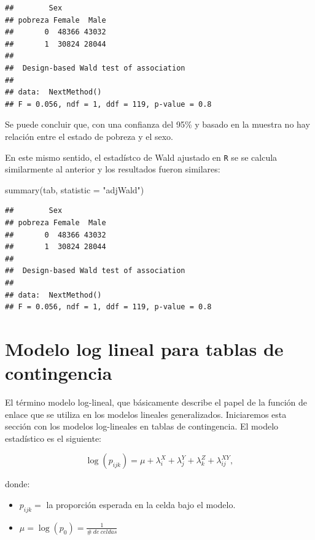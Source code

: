 \documentclass[
  12pt,
]{book}
\newenvironment{Shaded}{\begin{snugshade}}{\end{snugshade}}
\newcommand{\AttributeTok}[1]{\textcolor[rgb]{0.77,0.63,0.00}{#1}}
\newcommand{\FunctionTok}[1]{\textcolor[rgb]{0.00,0.00,0.00}{#1}}
\newcommand{\NormalTok}[1]{#1}
\newcommand{\StringTok}[1]{\textcolor[rgb]{0.31,0.60,0.02}{#1}}
\begin{document}
\begin{verbatim}
##        Sex
## pobreza Female  Male
##       0  48366 43032
##       1  30824 28044
## 
##  Design-based Wald test of association
## 
## data:  NextMethod()
## F = 0.056, ndf = 1, ddf = 119, p-value = 0.8
\end{verbatim}

Se puede concluir que, con una confianza del 95\% y basado en la muestra no hay relación entre el estado de pobreza y el sexo.

En este mismo sentido, el estadístco de Wald ajustado en \texttt{R} se se calcula similarmente al anterior y los resultados fueron similares:

\begin{Shaded}
\begin{Highlighting}[]
\FunctionTok{summary}\NormalTok{(tab, }\AttributeTok{statistic =} \StringTok{"adjWald"}\NormalTok{)}
\end{Highlighting}
\end{Shaded}

\begin{verbatim}
##        Sex
## pobreza Female  Male
##       0  48366 43032
##       1  30824 28044
## 
##  Design-based Wald test of association
## 
## data:  NextMethod()
## F = 0.056, ndf = 1, ddf = 119, p-value = 0.8
\end{verbatim}

\hypertarget{modelo-log-lineal-para-tablas-de-contingencia}{%
\section{Modelo log lineal para tablas de contingencia}\label{modelo-log-lineal-para-tablas-de-contingencia}}

El término modelo log-lineal, que básicamente describe el papel de la función de enlace que se utiliza en los modelos lineales generalizados. Iniciaremos esta sección con los modelos log-lineales en tablas de contingencia. El modelo estadístico es el siguiente:

\[
  \log(p_{ijk}) = \mu + \lambda_i^X + \lambda_j^Y + \lambda_k^Z + \lambda_{ij}^{XY}  ,   
\]

donde:

\begin{itemize}
\item
  \(p_{ijk}=\) la proporción esperada en la celda bajo el modelo.
\item
  \(\mu = \log(p_{0})=\frac{1}{\#\ de\ celdas}\)
\end{itemize}
\end{document}
